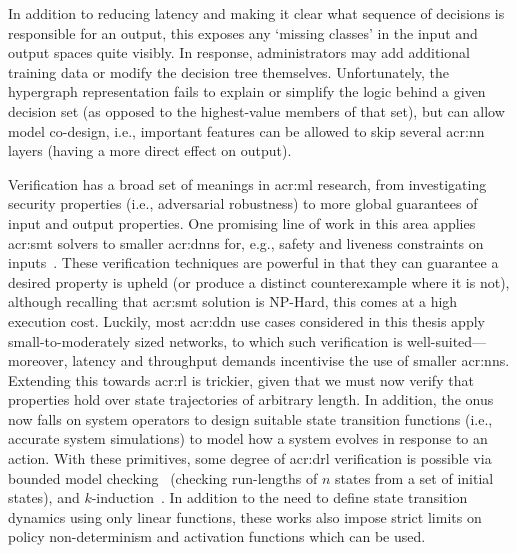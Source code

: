 In addition to reducing latency and making it clear what sequence of decisions is responsible for an output, this exposes any `missing classes' in the input and output spaces quite visibly.
In response, administrators may add additional training data or modify the decision tree themselves.
Unfortunately, the hypergraph representation fails to explain or simplify the logic behind a given decision set (as opposed to the highest-value members of that set), but can allow model co-design, i.e., important features can be allowed to skip several \gls{acr:nn} layers (having a more direct effect on output).

Verification has a broad set of meanings in \gls{acr:ml} research, from investigating security properties (i.e., adversarial robustness) to more global guarantees of input and output properties.
One promising line of work in this area applies \gls{acr:smt} solvers to smaller \glspl{acr:dnn} for, e.g., safety and liveness constraints on inputs~\parencite{DBLP:conf/cav/KatzBDJK17,DBLP:conf/cav/KatzHIJLLSTWZDK19}.
These verification techniques are powerful in that they can guarantee a desired property is upheld (or produce a distinct counterexample where it is not), although recalling that \gls{acr:smt} solution is \textsf{NP}-Hard, this comes at a high execution cost.
Luckily, most \gls{acr:ddn} use cases considered in this thesis apply small-to-moderately sized networks, to which such verification is well-suited---moreover, latency and throughput demands incentivise the use of smaller \glspl{acr:nn}.
Extending this towards \gls{acr:rl} is trickier, given that we must now verify that properties hold over state trajectories of arbitrary length.
In addition, the onus now falls on system operators to design suitable state transition functions (i.e., accurate system simulations) to model how a system evolves in response to an action.
With these primitives, some degree of \gls{acr:drl} verification is possible via bounded model checking~\parencite{DBLP:conf/sigcomm/KazakBKS19,DBLP:conf/sigcomm/EliyahuKKS21} (checking run-lengths of $n$ states from a set of initial states), and $k$-induction~\parencite{drl-verification-2}.
In addition to the need to define state transition dynamics using only linear functions, these works also impose strict limits on policy non-determinism and activation functions which can be used.

